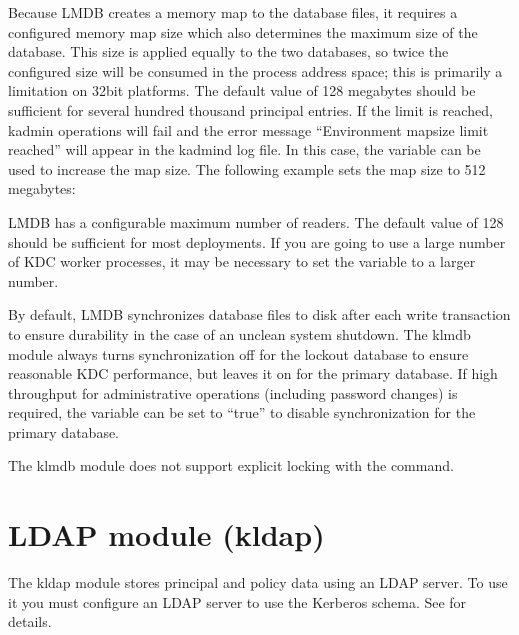 \documentclass[letterpaper,10pt,english]{sphinxmanual}
\begin{document}
\sphinxAtStartPar
Because LMDB creates a memory map to the database files, it requires a
configured memory map size which also determines the maximum size of
the database.  This size is applied equally to the two databases, so
twice the configured size will be consumed in the process address
space; this is primarily a limitation on 32\sphinxhyphen{}bit platforms.  The
default value of 128 megabytes should be sufficient for several
hundred thousand principal entries.  If the limit is reached, kadmin
operations will fail and the error message “Environment mapsize limit
reached” will appear in the kadmind log file.  In this case, the
 variable can be used to increase the map size.  The
following example sets the map size to 512 megabytes:

\begin{sphinxVerbatim}[commandchars=\\\{\}]
\PYG{p}{[}\PYG{p}{]}
      
          
          
\end{sphinxVerbatim}

\sphinxAtStartPar
LMDB has a configurable maximum number of readers.  The default value
of 128 should be sufficient for most deployments.  If you are going to
use a large number of KDC worker processes, it may be necessary to set
the  variable to a larger number.

\sphinxAtStartPar
By default, LMDB synchronizes database files to disk after each write
transaction to ensure durability in the case of an unclean system
shutdown.  The klmdb module always turns synchronization off for the
lockout database to ensure reasonable KDC performance, but leaves it
on for the primary database.  If high throughput for administrative
operations (including password changes) is required, the 
variable can be set to “true” to disable synchronization for the
primary database.

\sphinxAtStartPar
The klmdb module does not support explicit locking with the
{\hyperref[\detokenize{admin/admin_commands/kadmin_local:kadmin-1}]{}}  command.


\section{LDAP module (kldap)}
\label{\detokenize{admin/dbtypes:ldap-module-kldap}}
\sphinxAtStartPar
The kldap module stores principal and policy data using an LDAP
server.  To use it you must configure an LDAP server to use the
Kerberos schema.  See {\hyperref[\detokenize{admin/conf_ldap:conf-ldap}]{}} for details.
\end{document}
